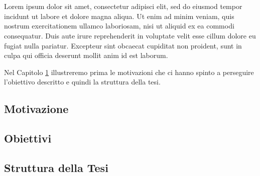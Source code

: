 \chapter{}
\label{chap:1-introduction}

Lorem ipsum dolor sit amet, consectetur adipisci elit, sed do eiusmod tempor incidunt ut labore et dolore magna aliqua. Ut enim ad minim veniam, quis nostrum exercitationem ullamco laboriosam, nisi ut aliquid ex ea commodi consequatur. Duis aute irure reprehenderit in voluptate velit esse cillum dolore eu fugiat nulla pariatur. Excepteur sint obcaecat cupiditat non proident, sunt in culpa qui officia deserunt mollit anim id est laborum.

Nel Capitolo \ref{chap:1-introduction} illustreremo prima le motivazioni che ci hanno spinto a perseguire l'obiettivo descritto e quindi la struttura della tesi.

\section{Motivazione}
\section{Obiettivi}
\section{Struttura della Tesi}
